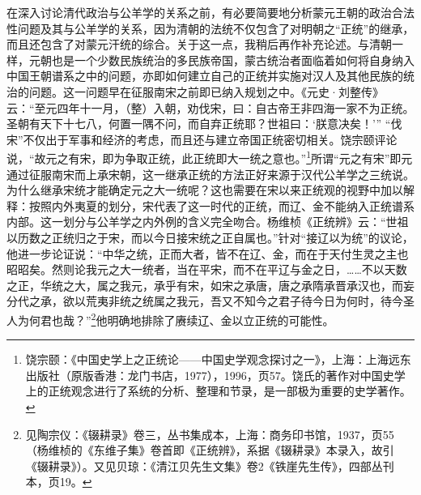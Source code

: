 \documentclass[a4paper, 12pt, openright]{ctexbook}
\begin{document}
在深入讨论清代政治与公羊学的关系之前，有必要简要地分析蒙元王朝的政治合法性问题及其与公羊学的关系，因为清朝的法统不仅包含了对明朝之“正统”的继承，而且还包含了对蒙元汗统的综合。关于这一点，我稍后再作补充论述。与清朝一样，元朝也是一个少数民族统治的多民族帝国，蒙古统治者面临着如何将自身纳入中国王朝谱系之中的问题，亦即如何建立自己的正统并实施对汉人及其他民族的统治的问题。这一问题早在征服南宋之前即已纳入规划之中。《元史·刘整传》云：“至元四年十一月，（整）入朝，劝伐宋，曰：自古帝王非四海一家不为正统。圣朝有天下十七八，何置一隅不问，而自弃正统耶？世祖曰：‘朕意决矣！’” “伐宋”不仅出于军事和经济的考虑，而且还与建立帝国正统密切相关。饶宗颐评论说，“故元之有宋，即为争取正统，此正统即大一统之意也。”\footnote{饶宗颐：《中国史学上之正统论——中国史学观念探讨之一》，上海：上海远东出版社（原版香港：龙门书店，1977），1996，页57。饶氏的著作对中国史学上的正统观念进行了系统的分析、整理和节录，是一部极为重要的史学著作。}所谓“元之有宋”即元通过征服南宋而上承宋朝，这一继承正统的方法正好来源于汉代公羊学之三统说。为什么继承宋统才能确定元之大一统呢？这也需要在宋以来正统观的视野中加以解释：按照内外夷夏的划分，宋代表了这一时代的正统，而辽、金不能纳入正统谱系内部。这一划分与公羊学之内外例的含义完全吻合。杨维桢《正统辨》云：“世祖以历数之正统归之于宋，而以今日接宋统之正自属也。”针对“接辽以为统”的议论，他进一步论证说：“中华之统，正而大者，皆不在辽、金，而在于天付生灵之主也昭昭矣。然则论我元之大一统者，当在平宋，而不在平辽与金之日，……不以天数之正，华统之大，属之我元，承乎有宋，如宋之承唐，唐之承隋承晋承汉也，而妄分代之承，欲以荒夷非统之统属之我元，吾又不知今之君子待今日为何时，待今圣人为何君也哉？”\footnote{见陶宗仪：《辍耕录》卷三，丛书集成本，上海：商务印书馆，1937，页55（杨维桢的《东维子集》卷首即《正统辨》，系据《辍耕录》本录入，故引《辍耕录》）。又见贝琼：《清江贝先生文集》卷2《铁崖先生传》，四部丛刊本，页19。}他明确地排除了赓续辽、金以立正统的可能性。
\end{document}
